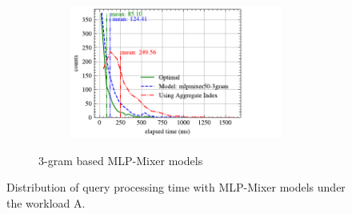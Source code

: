 \begin{figure}[!h]
\begin{subfigure}{0.45\textwidth}
\begin{subfigure}{\textwidth}
		\end{subfigure}
		\vfill
		\begin{subfigure}{\textwidth}
			\centering
			\includegraphics[]{my/graphics/perf_dist_mlpmixer50_3gram_A.pdf}
		\end{subfigure}
		\caption{3-gram based MLP-Mixer models}
	\end{subfigure}
	\caption{Distribution of query processing time with MLP-Mixer models under the workload A.}
	\label{fig:mlpmixer_perf_all_A}
\end{figure}
